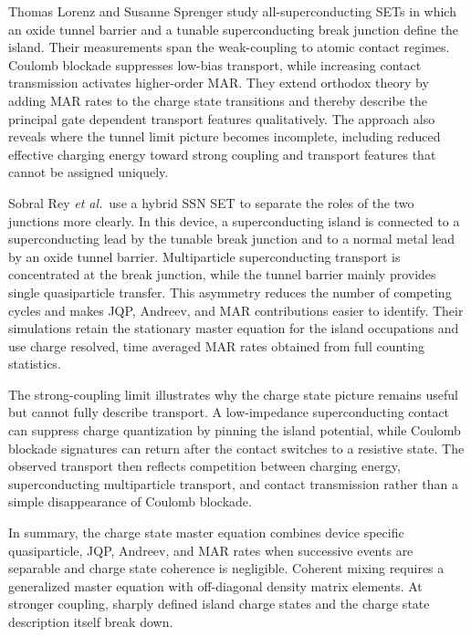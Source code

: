             Thomas Lorenz and Susanne Sprenger study all-superconducting SETs in which an oxide tunnel barrier and a tunable superconducting break junction define the island. Their measurements span the weak-coupling to atomic contact regimes. Coulomb blockade suppresses low-bias transport, while increasing contact transmission activates higher-order MAR. They extend orthodox theory by adding MAR rates to the charge state transitions and thereby describe the principal gate dependent transport features qualitatively. The approach also reveals where the tunnel limit picture becomes incomplete, including reduced effective charging energy toward strong coupling and transport features that cannot be assigned uniquely. \cite{lorenz_sset_mar_2018,lorenz_wechselspiel_2018,sprenger_interplay_2019}

            Sobral Rey \textit{et al.}~use a hybrid SSN SET to separate the roles of the two junctions more clearly. In this device, a superconducting island is connected to a superconducting lead by the tunable break junction and to a normal metal lead by an oxide tunnel barrier. Multiparticle superconducting transport is concentrated at the break junction, while the tunnel barrier mainly provides single quasiparticle transfer. This asymmetry reduces the number of competing cycles and makes JQP, Andreev, and MAR contributions easier to identify. Their simulations retain the stationary master equation for the island occupations and use charge resolved, time averaged MAR rates obtained from full counting statistics. \cite{sobral_rey_hybrid_sset_2024,sobral_rey_interplay_2022}

            The strong-coupling limit illustrates why the charge state picture remains useful but cannot fully describe transport. A low-impedance superconducting contact can suppress charge quantization by pinning the island potential, while Coulomb blockade signatures can return after the contact switches to a resistive state. The observed transport then reflects competition between charging energy, superconducting multiparticle transport, and contact transmission rather than a simple disappearance of Coulomb blockade. \cite{sobral_rey_hybrid_sset_2024,sobral_rey_interplay_2022}

            In summary, the charge state master equation combines device specific quasiparticle, JQP, Andreev, and MAR rates when successive events are separable and charge state coherence is negligible. Coherent mixing requires a generalized master equation with off-diagonal density matrix elements. At stronger coupling, sharply defined island charge states and the charge state description itself break down.
